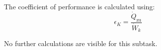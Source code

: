 The coefficient of performance is calculated using:  
\[
\epsilon_K = \frac{\dot{Q}_{\text{zu}}}{\dot{W}_k}
\]  

No further calculations are visible for this subtask.